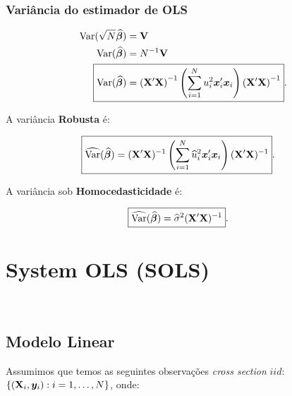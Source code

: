 \documentclass[11pt, oneside, a4paper, article]{article}
\numberwithin{equation}{section}
\begin{document}
\subsubsection{Variância do estimador de OLS }

\vspace{-1 em}
\begin{align*}
	\Var(\sqrt{N} \betahatbold) &= \Vmat
	\\
	\Var(\betahatbold) &= N^{-1} \Vmat
	\\
	\Aboxed{
		\Var(\betahatbold) &= 
		\left( \Xmat'\Xmat \right)^{-1}
		\left( \sum_{i=1}^{N} u_{i}^2 \xvec_{i}' \xvec_{i} \right)
	\left( \Xmat'\Xmat \right)^{-1} }.
\end{align*}

\noindent
A variância \textbf{Robusta} é:

\vspace{-1 em}
\begin{align*}
	\Aboxed{
		\widehat{\Var}(\betahatbold) &= 
		(\Xmat'\Xmat)^{-1} 
		\left( \sum_{i=1}^{N} \widehat{u}_{i}^{2} \xvec_{i}' \xvec_{i} \right)
	(\Xmat'\Xmat)^{-1} }.
\end{align*}

\noindent
A variância sob \textbf{Homocedasticidade} é:

\vspace{-1 em}
\begin{align*}
	\Aboxed{\widehat{\Var}(\betahatbold) &= \widehat{\sigma}^{2} (\Xmat' \Xmat)^{-1}} .
\end{align*}

\clearpage
\section{System OLS (SOLS)}

\noindent
\citet[C.7 -- Estimating Systems of Equations by OLS and GLS, p.143--179]{wool-2010}\\
\citet[Sec.7.3 -- System OLS Estimation of a Multivariate Linear System, p.147]{wool-2010} 

\subsection{Modelo Linear}

Assumimos que temos as seguintes observações \textit{cross section} $iid$:
$\{ (\mathbf{X}_{i}, \boldsymbol{y}_{i}): i=1, \dots, N\}$, onde:
\end{document}
